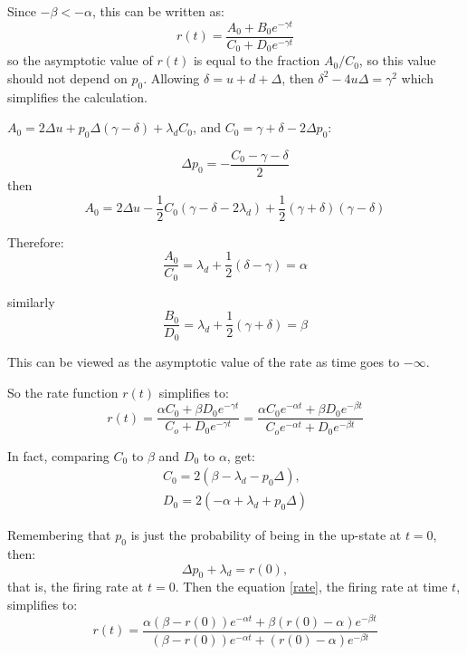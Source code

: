 Since $-\beta<-\alpha$, this can be written as:
\begin{equation}
r(t) = \frac{A_0+B_0e^{-\gamma t}}{C_0 + D_0e^{-\gamma t}}
\end{equation}
so the asymptotic value of $r(t)$ is equal to the fraction $A_0/C_0$, so this value should not depend on $p_0$.  Allowing $\delta=u+d+\Delta$, then $\delta^2 -4u\Delta= \gamma^2$ which simplifies the calculation.

$A_0 = 2\Delta u + p_0\Delta(\gamma-\delta) + \lambda_d C_0$, and $C_0 = \gamma + \delta -2\Delta p_0$:

\begin{equation}
\Delta p_0 = -\frac{C_0 - \gamma - \delta}{2}
\end{equation}
then
\begin{equation}
A_0 = 2\Delta u - \frac{1}{2}C_0(\gamma-\delta - 2\lambda_d) +\frac{1}{2}(\gamma+\delta)(\gamma-\delta)
\end{equation}

Therefore:
\begin{equation}
\frac{A_0}{C_0} = \lambda_d + \frac{1}{2}(\delta-\gamma) = \alpha
\end{equation}

similarly
\begin{equation}
\frac{B_0}{D_0} = \lambda_d + \frac{1}{2}(\gamma+\delta) = \beta
\end{equation}

This can be viewed as the asymptotic value of the rate as time goes to $-\infty$.

So the rate function $r(t)$ simplifies to:
\begin{equation}\label{rate}
r(t) = \frac{\alpha C_0 + \beta D_0e^{-\gamma t}}{C_o + D_0e^{-\gamma t}} = \frac{\alpha C_0e^{-\alpha t} + \beta D_0e^{-\beta t}}{C_oe^{-\alpha t} + D_0e^{-\beta t}} 
\end{equation}

In fact, comparing $C_0$ to $\beta$ and $D_0$ to $\alpha$, get:
\begin{equation}
\begin{split}
C_0 = 2(\beta - \lambda_d - p_0\Delta), \\ 
D_0 = 2(-\alpha + \lambda_d + p_0\Delta)
\end{split}
\end{equation}

Remembering that $p_0$ is just the probability of being in the up-state at $t=0$, then:
\begin{equation}
\Delta p_0 + \lambda_d = r(0),
\end{equation}
that is, the firing rate at $t=0$.  Then the equation \ref{rate}, the firing rate at time $t$, simplifies to:
\begin{equation}
r(t) = \frac{\alpha(\beta - r(0))e^{-\alpha t} + \beta(r(0)-\alpha)e^{-\beta t}}{(\beta - r(0))e^{-\alpha t} + (r(0)-\alpha)e^{-\beta t}}
\end{equation}


